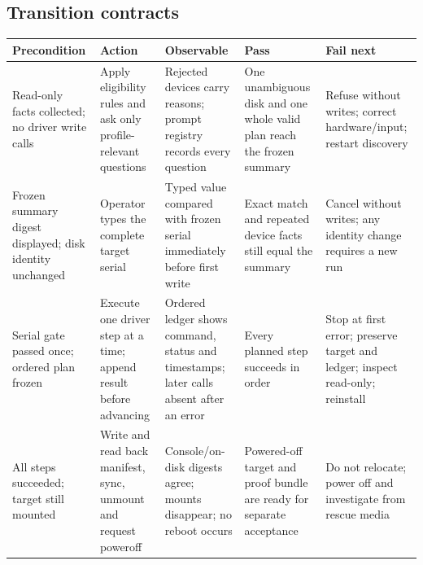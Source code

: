 \subsection*{Transition contracts}
{\footnotesize
\begin{tabularx}{\linewidth}{@{}p{.16\linewidth}p{.17\linewidth}p{.20\linewidth}p{.20\linewidth}L@{}}
\toprule
\textbf{Precondition} & \textbf{Action} & \textbf{Observable} & \textbf{Pass} & \textbf{Fail next}\\
\midrule
Read-only facts collected; no driver write calls & Apply eligibility rules and ask only profile-relevant questions & Rejected devices carry reasons; prompt registry records every question & One unambiguous disk and one whole valid plan reach the frozen summary & Refuse without writes; correct hardware/input; restart discovery\\
Frozen summary digest displayed; disk identity unchanged & Operator types the complete target serial & Typed value compared with frozen serial immediately before first write & Exact match and repeated device facts still equal the summary & Cancel without writes; any identity change requires a new run\\
Serial gate passed once; ordered plan frozen & Execute one driver step at a time; append result before advancing & Ordered ledger shows command, status and timestamps; later calls absent after an error & Every planned step succeeds in order & Stop at first error; preserve target and ledger; inspect read-only; reinstall\\
All steps succeeded; target still mounted & Write and read back manifest, sync, unmount and request poweroff & Console/on-disk digests agree; mounts disappear; no reboot occurs & Powered-off target and proof bundle are ready for separate acceptance & Do not relocate; power off and investigate from rescue media\\
\bottomrule
\end{tabularx}}

